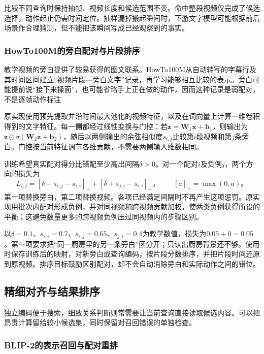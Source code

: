 比较不同查询时保持抽帧、视频长度和候选范围不变。命中整段视频仅完成了候选选择，动作起止仍需时间定位。抽样漏掉搬起瞬间时，下游文字模型可能根据前后场景作合理猜测，但不能把该瞬间写成已经观察到的事实。

\subsubsection{HowTo100M的旁白配对与片段排序}
\label{sec:vision-understanding-howto}

教学视频的旁白提供了较易获得的图文联系。HowTo100M从自动转写的字幕行及其时间区间建立“视频片段—旁白文字”记录，再学习能够相互比较的表示。旁白可能提前说“接下来揉面”，也可能省略手上正在做的动作，因而这种记录是弱配对，不是逐帧动作标注

原实现使用预先提取并沿时间最大池化的视频特征，以及在词向量上计算一维卷积得到的文字特征。每一侧都经过线性变换与门控：若$\bm z=\bm W_1\bm x+\bm b_1$，则输出为$\bm z\odot\sigma(\bm W_2\bm z+\bm b_2)$，随后以两侧输出的余弦相似度$s_{i,j}$比较第$i$段视频和第$j$条旁白。门控按当前特征调节各维贡献，不需要两侧输入维数相同。

训练希望真实配对得分比错配至少高出间隔$\delta>0$。对一个配对$i$及负例$j$，两个方向的损失为
\begin{equation}
  L_{i,j}=[\delta+s_{i,j}-s_{i,i}]_+
          +[\delta+s_{j,i}-s_{i,i}]_+\text{，}
  \qquad [a]_+=\max(0,a)\text{。}
  \label{eq:vision-howto-ranking}
\end{equation}
第一项替换旁白，第二项替换视频。各项已经满足间隔时不再产生这项惩罚。原实现用批次内配对形成负例，并对同视频和跨视频贡献加权，使两类负例获得所设的平衡；这避免数量更多的跨视频负例压过同视频内的步骤区别。

以$\delta=0.1$、$s_{i,i}=0.7$、$s_{i,j}=0.65$、$s_{j,i}=0.4$为教学数值，损失为$0.05+0=0.05$。第一项要求把“同一厨房里的另一条旁白”区分开；只认出厨房背景还不够。使用时保存训练后的映射，对新旁白或查询编码，按片段分数排序，并把片段时间还原到原视频。排序目标鼓励区别配对，却不会自动消除旁白和实际动作之间的错位。

\subsection{精细对齐与结果排序}
\label{sec:vision-understanding-reranking}

独立编码便于搜索，细致关系判断则常需要让当前查询直接读取候选内容。可以把昂贵计算留给较小候选集，同时保留对召回错误的单独检查。

\subsubsection{BLIP-2的表示召回与配对重排}
\label{sec:vision-understanding-blip-retrieval}

